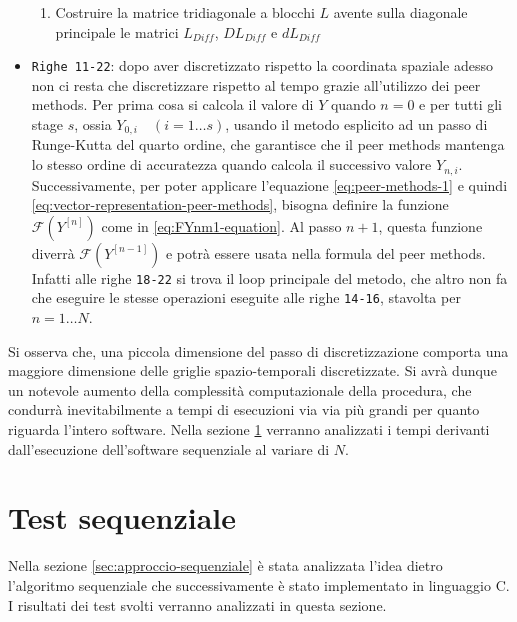 \begin{itemize}
\begin{enumerate}
        \item Costruire la matrice tridiagonale a blocchi $L$ avente sulla diagonale principale le matrici $L_{Diff}$, $DL_{Diff}$ e $dL_{Diff}$
    \end{enumerate}
    \item \texttt{Righe 11-22}: dopo aver discretizzato rispetto la coordinata spaziale adesso non ci resta che discretizzare rispetto al tempo grazie all'utilizzo dei peer methods. Per prima cosa si calcola il valore di $Y$ quando $n = 0$ e per tutti gli stage $s$, ossia $Y_{0, i} \quad (i = 1 \ldots s)$, usando il metodo esplicito ad un passo di Runge-Kutta del quarto ordine, che garantisce che il peer methods mantenga lo stesso ordine di accuratezza quando calcola il successivo valore $Y_{n, i}$. Successivamente, per poter applicare l'equazione \eqref{eq:peer-methods-1} e quindi \eqref{eq:vector-representation-peer-methods}, bisogna definire la funzione $\mathcal{F}(Y^{[n]})$ come in \eqref{eq:FYnm1-equation}. Al passo $n + 1$, questa funzione diverrà $\mathcal{F}(Y^{[n - 1]})$ e potrà essere usata nella formula del peer methods. Infatti alle righe \texttt{18-22} si trova il loop principale del metodo, che altro non fa che eseguire le stesse operazioni eseguite alle righe \texttt{14-16}, stavolta per $n = 1 \ldots N$.
\end{itemize}

\noindent Si osserva che, una piccola dimensione del passo di discretizzazione comporta una maggiore dimensione delle griglie spazio-temporali discretizzate. Si avrà dunque un notevole aumento della complessità computazionale della procedura, che condurrà inevitabilmente a tempi di esecuzioni via via più grandi per quanto riguarda l'intero software. Nella sezione \ref{sec:sequential_test} verranno analizzati i tempi derivanti dall'esecuzione dell'software sequenziale  al variare di $N$.

\section{Test sequenziale} \label{sec:sequential_test}

\noindent Nella sezione \ref{sec:approccio-sequenziale} è stata analizzata l'idea dietro l'algoritmo sequenziale che successivamente è stato implementato in linguaggio C. I risultati dei test svolti verranno analizzati in questa sezione. 
\vspace{0.2cm}


